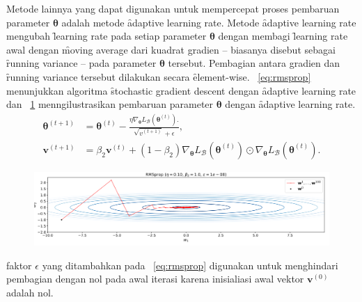 Metode lainnya yang dapat digunakan untuk mempercepat proses pembaruan parameter $\bm{\theta}$ adalah metode \f{adaptive learning rate}. Metode \f{adaptive learning rate} mengubah \f{learning rate} pada setiap parameter $\bm{\theta}$ dengan membagi \f{learning rate} awal dengan \f{moving average} dari kuadrat gradien -- biasanya disebut sebagai \f{running variance} -- pada parameter $\bm{\theta}$ tersebut. Pembagian antara gradien dan \f{running variance} tersebut dilakukan secara \f{element-wise}. \equ~\ref{eq:rmsprop} menunjukkan algoritma \f{stochastic gradient descent} dengan \f{adaptive learning rate} dan \pic~\ref{fig:rmsprop} menngilustrasikan pembaruan parameter $\bm{\theta}$ dengan \f{adaptive learning rate}.
\begin{align}
    \label{eq:rmsprop}
    \bm{\theta}^{(t+1)} &= \bm{\theta}^{(t)} - \frac{\eta \nabla_{\bm{\theta}} L_{\mathcal{B}}(\bm{\theta}^{(t)}).}{\sqrt{v^{(t+1)}} + \epsilon}, \\
    \bm{v}^{(t+1)} &= \beta_2 \bm{v}^{(t)} + (1 - \beta_2) \nabla_{\bm{\theta}} L_{\mathcal{B}}(\bm{\theta}^{(t)})\odot \nabla_{\bm{\theta}} L_{\mathcal{B}}(\bm{\theta}^{(t)}).
\end{align}
\begin{figure}
    \centering
    \includegraphics[width=1\textwidth]{assets/pics/RMSPROP.png}
    \label{fig:rmsprop}
\end{figure}

faktor $\epsilon$ yang ditambahkan pada \equ~\ref{eq:rmsprop} digunakan untuk menghindari pembagian dengan nol pada awal iterasi karena inisialiasi awal vektor $\bm{v}^{(0)}$ adalah nol.

